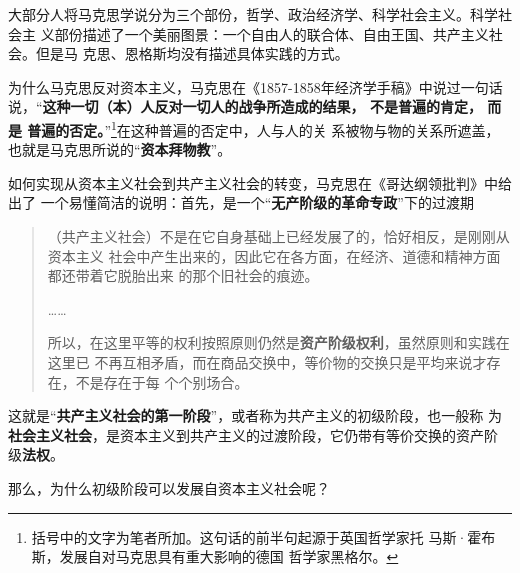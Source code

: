 大部分人将马克思学说分为三个部份，哲学、政治经济学、科学社会主义。科学社会主
义部份描述了一个美丽图景：一个自由人的联合体、自由王国、共产主义社会。但是马
克思、恩格斯均没有描述具体实践的方式。

为什么马克思反对资本主义，马克思在《1857-1858年经济学手稿》中说过一句话
说，“\textbf{这种一切（本）人反对一切人的战争所造成的结果， 不是普遍的肯定， 而是
  普遍的否定。}”\footnote{括号中的文字为笔者所加。这句话的前半句起源于英国哲学家托
  马斯·霍布斯，发展自对马克思具有重大影响的德国
  哲学家黑格尔。}在这种普遍的否定中，人与人的关
系被物与物的关系所遮盖，也就是马克思所说的“\textbf{资本拜物教}”。

如何实现从资本主义社会到共产主义社会的转变，马克思在《哥达纲领批判》中给出了
一个易懂简洁的说明：首先，是一个“\textbf{无产阶级的革命专政}”下的过渡期
\begin{quotation}
  （共产主义社会）不是在它自身基础上已经发展了的，恰好相反，是刚刚从资本主义
  社会中产生出来的，因此它在各方面，在经济、道德和精神方面都还带着它脱胎出来
  的那个旧社会的痕迹。

  ……

  所以，在这里平等的权利按照原则仍然是\textbf{资产阶级权利}，虽然原则和实践在这里已
  不再互相矛盾，而在商品交换中，等价物的交换只是平均来说才存在，不是存在于每
  个个别场合。
\end{quotation}

这就是“\textbf{共产主义社会的第一阶段}”，或者称为共产主义的初级阶段，也一般称
为\textbf{社会主义社会}，是资本主义到共产主义的过渡阶段，它仍带有等价交换的资产阶
级\textbf{法权}。

那么，为什么初级阶段可以发展自资本主义社会呢？



